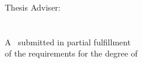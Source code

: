 \begin{titlepage}
\center

\Large \university{} \campus\\[1.5cm]

\large \department\\[2cm]

{\huge\bfseries\thesistitle}\\[2cm]

\student\\
\medskip
\studentnumber\\[2cm]

Thesis Adviser:\\
\medskip
\adviser\\[2cm]

{\large \submissiondate}\\[2cm]

A \thesistype\ submitted in partial fulfillment\\of the requirements for the degree of\\
\degree

\end{titlepage}
